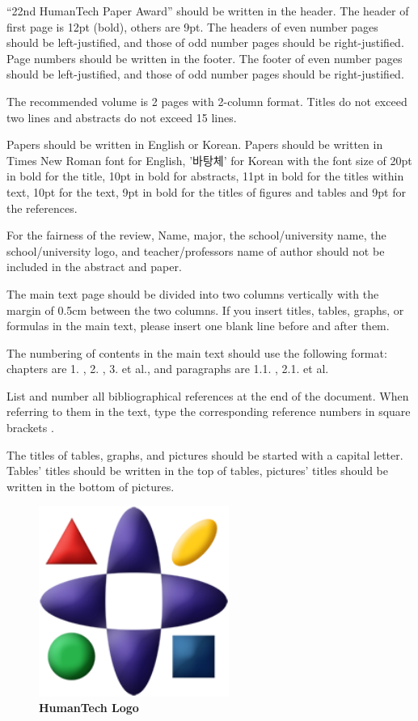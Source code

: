 \documentclass{abstract_hutech}
\begin{document}
``22nd HumanTech Paper Award'' should be written in the header. The header of first page is 12pt (bold), others are 9pt. The headers of even number pages should be left-justified, and those of odd number pages should be right-justified. Page numbers should be written in the footer. The footer of even number pages should be left-justified, and those of odd number pages should be right-justified.

The recommended volume is 2 pages with 2-column format. Titles do not exceed two lines and abstracts do not exceed 15 lines.

Papers should be written in English or Korean. Papers should be written in Times New Roman font for English, '바탕체' for Korean with the font size of 20pt in bold for the title, 10pt in bold for abstracts, 11pt in bold for the titles within text, 10pt for the text, 9pt in bold for the titles of figures and tables and 9pt for the references.

For the fairness of the review, Name, major, the school/university name, the school/university logo, and teacher/professors name of author should not be included in the abstract and paper.

The main text page should be divided into two columns vertically with the margin of 0.5cm between the two columns. If you insert titles, tables, graphs, or formulas in the main text, please insert one blank line before and after them.

The numbering of contents in the main text should use the following format: chapters are 1. , 2. , 3. et al., and paragraphs are 1.1. , 2.1. et al.

List and number all bibliographical references at the end of the document. When referring to them in the text, type the corresponding reference numbers in square brackets \cite{True00}.

The titles of tables, graphs, and pictures should be started with a capital letter. Tables’ titles should be written in the top of tables, pictures’ titles should be written in the bottom of pictures.

\begin{figure}[t]
\begin{center}
\includegraphics[width=6.23cm]{symbol_trophy_img}
\end{center}
\caption{\bf HumanTech Logo}\label{Fig01}
\end{figure}
\end{document}
